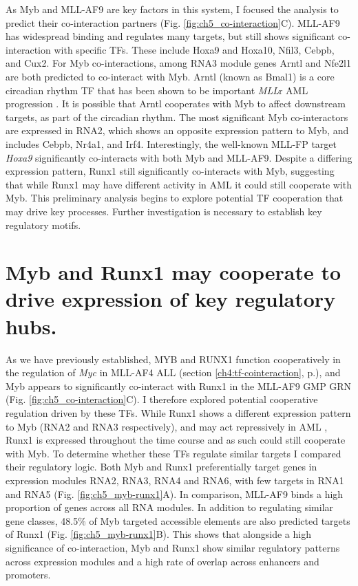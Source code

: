 As Myb and MLL-AF9 are key factors in this system, I focused the analysis to predict their co-interaction partners (Fig. \ref{fig:ch5_co-interaction}C). MLL-AF9 has widespread binding and regulates many targets, but still shows significant co-interaction with specific TFs. These include Hoxa9 and Hoxa10, Nfil3, Cebpb, and Cux2. For Myb co-interactions, among RNA3 module genes Arntl and Nfe2l1 are both predicted to co-interact with Myb. Arntl (known as Bmal1) is a core circadian rhythm TF that has been shown to be important \textit{MLL}r AML progression \citep{puram_core_2016}. It is possible that Arntl cooperates with Myb to affect downstream targets, as part of the circadian rhythm. The most significant Myb co-interactors are expressed in RNA2, which shows an opposite expression pattern to Myb, and includes Cebpb, Nr4a1, and Irf4. Interestingly, the well-known MLL-FP target \textit{Hoxa9} \citep{milne_multiple_2010} significantly co-interacts with both Myb and MLL-AF9. Despite a differing expression pattern, Runx1 still significantly co-interacts with Myb, suggesting that while Runx1 may have different activity in AML it could still cooperate with Myb. This preliminary analysis begins to explore potential TF cooperation that may drive key processes. Further investigation is necessary to establish key regulatory motifs.

\section{\label{ch5:myb-runx1}Myb and Runx1 may cooperate to drive expression of key regulatory hubs.}

As we have previously established, MYB and RUNX1 function cooperatively in the regulation of \textit{Myc} in MLL-AF4 ALL (section \ref{ch4:tf-cointeraction}, p.\pageref{ch4:tf-cointeraction}), and Myb appears to significantly co-interact with Runx1 in the MLL-AF9 GMP GRN (Fig. \ref{fig:ch5_co-interaction}C). I therefore explored potential cooperative regulation driven by these TFs. While Runx1 shows a different expression pattern to Myb (RNA2 and RNA3 respectively), and may act repressively in AML \citep{simeoni_enhancer_2021}, Runx1 is expressed throughout the time course and as such could still cooperate with Myb. To determine whether these TFs regulate similar targets I compared their regulatory logic. Both Myb and Runx1 preferentially target genes in expression modules RNA2, RNA3, RNA4 and RNA6, with few targets in RNA1 and RNA5 (Fig. \ref{fig:ch5_myb-runx1}A). In comparison, MLL-AF9 binds a high proportion of genes across all RNA modules. In addition to regulating similar gene classes, 48.5\% of Myb targeted accessible elements are also predicted targets of Runx1 (Fig. \ref{fig:ch5_myb-runx1}B). This shows that alongside a high significance of co-interaction, Myb and Runx1 show similar regulatory patterns across expression modules and a high rate of overlap across enhancers and promoters.

